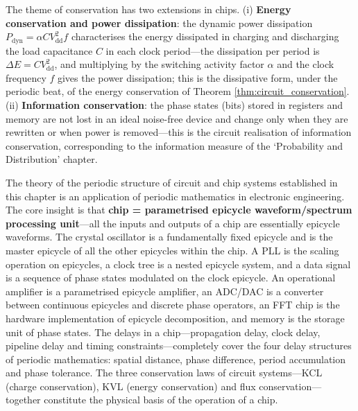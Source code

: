 \begin{remark}\label{ch24_power_info_conservation}
The theme of conservation has two extensions in chips. (i) \textbf{Energy conservation and power dissipation}: the dynamic power dissipation $P_{\text{dyn}} = \alpha C V_{\text{dd}}^2 f$ characterises the energy dissipated in charging and discharging the load capacitance $C$ in each clock period---the dissipation per period is $\Delta E = C V_{\text{dd}}^2$, and multiplying by the switching activity factor $\alpha$ and the clock frequency $f$ gives the power dissipation; this is the dissipative form, under the periodic beat, of the energy conservation of Theorem \ref{thm:circuit_conservation}. (ii) \textbf{Information conservation}: the phase states (bits) stored in registers and memory are not lost in an ideal noise-free device and change only when they are rewritten or when power is removed---this is the circuit realisation of information conservation, corresponding to the information measure of the `Probability and Distribution' chapter.
\end{remark}

\begin{remark}
The theory of the periodic structure of circuit and chip systems established in this chapter is an application of periodic mathematics in electronic engineering. The core insight is that \textbf{chip = parametrised epicycle waveform/spectrum processing unit}---all the inputs and outputs of a chip are essentially epicycle waveforms. The crystal oscillator is a fundamentally fixed epicycle and is the master epicycle of all the other epicycles within the chip. A PLL is the scaling operation on epicycles, a clock tree is a nested epicycle system, and a data signal is a sequence of phase states modulated on the clock epicycle. An operational amplifier is a parametrised epicycle amplifier, an ADC/DAC is a converter between continuous epicycles and discrete phase operators, an FFT chip is the hardware implementation of epicycle decomposition, and memory is the storage unit of phase states. The delays in a chip---propagation delay, clock delay, pipeline delay and timing constraints---completely cover the four delay structures of periodic mathematics: spatial distance, phase difference, period accumulation and phase tolerance. The three conservation laws of circuit systems---KCL (charge conservation), KVL (energy conservation) and flux conservation---together constitute the physical basis of the operation of a chip.
\end{remark}

